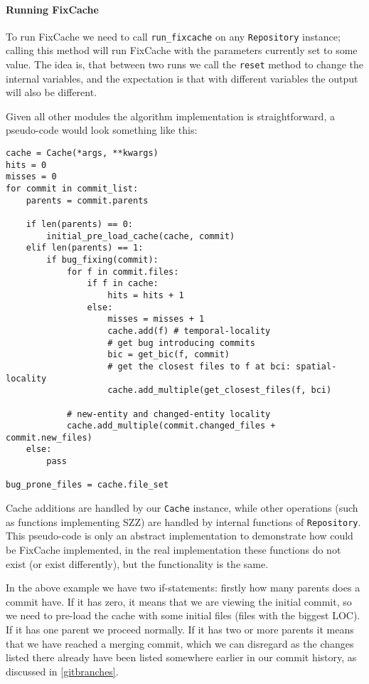 \documentclass[12pt,twoside,notitlepage]{report}
\newcommand{\fxch}{FixCache }
\begin{document}
\paragraph{Running \fxch}
To run \fxch we need to call \texttt{run\_fixcache} on any \texttt{Repository} instance; calling this method will run \fxch with the parameters currently set to some value. The idea is, that between two runs we call the \texttt{reset} method to change the internal variables, and the expectation is that with different variables the output will also be different.

Given all other modules the algorithm implementation is straightforward, a pseudo-code would look something like this:
\begin{lstlisting}
cache = Cache(*args, **kwargs)
hits = 0
misses = 0
for commit in commit_list:
	parents = commit.parents
	
	if len(parents) == 0:
		initial_pre_load_cache(cache, commit)
	elif len(parents) == 1:
		if bug_fixing(commit):
			for f in commit.files:
				if f in cache:
					hits = hits + 1
				else:
					misses = misses + 1
					cache.add(f) # temporal-locality
					# get bug introducing commits
					bic = get_bic(f, commit)
					# get the closest files to f at bci: spatial-locality
					cache.add_multiple(get_closest_files(f, bci)
			
			# new-entity and changed-entity locality
			cache.add_multiple(commit.changed_files + commit.new_files)
	else:
		pass

bug_prone_files = cache.file_set
\end{lstlisting}
Cache additions are handled by our \texttt{Cache} instance, while other operations (such as functions implementing SZZ) are handled by internal functions of \texttt{Repository}. This pseudo-code is only an abstract implementation to demonstrate how could be \fxch implemented, in the real implementation these functions do not exist (or exist differently), but the functionality is the same.

In the above example we have two if-statements: firstly how many parents does a commit have. If it has zero, it means that we are viewing the initial commit, so we need to pre-load the cache with some initial files (files with the biggest LOC). If it has one parent we proceed normally. If it has two or more parents it means that we have reached a merging commit, which we can disregard as the changes listed there already have been listed somewhere earlier in our commit history, as discussed in \ref{gitbranches}.
\end{document}
